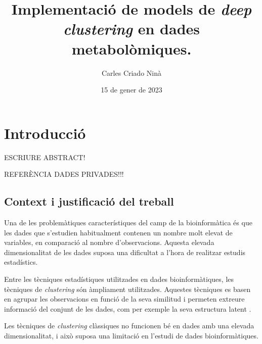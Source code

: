 \documentclass[CAT,BIB]{TFUOC}%
\title{Implementació de models de \textit{deep clustering} en dades metabolòmiques.}
\author{Carles Criado Ninà}
\date{15 de gener de 2023}
\newcommand{\todo}[1]{
            \begin{tcolorbox}[title=ToDo!, colback=red!5!white, colframe=red!50!black, coltext=red!50!black]
            #1
            \end{tcolorbox}}
\begin{document}
\estructura

\tableofcontents

\listoffigures

\listoftables




\chapter{Introducció}
\label{s:intro}

\todo{ESCRIURE ABSTRACT!

    REFERÈNCIA DADES PRIVADES!!!
}

    \section{Context i justificació del treball}
    \label{s:contect}

        Una de les problemàtiques característiques
        del camp de la bioinformàtica
        és que les dades que s'estudien
        habitualment contenen un nombre molt elevat de variables,
        en comparació al nombre d'observacions.
        Aquesta elevada dimensionalitat de les dades
        suposa una dificultat a l'hora de realitzar estudis estadístics.

        Entre les tècniques estadístiques
        utilitzades en dades bioinformàtiques,
        les tècniques de \textit{clustering}
        són àmpliament utilitzades.
        Aquestes tècniques es basen en agrupar les observacions
        en funció de la seva similitud
        i permeten extreure informació del conjunt de les dades,
        com per exemple la seva estructura latent \citep{Karim2021, Masood2015}.

        Les tècniques de \textit{clustering} clàssiques
        no funcionen bé en dades amb una elevada dimensionalitat,
        i això suposa una limitació en l'estudi de dades bioinformàtiques.
\end{document}
